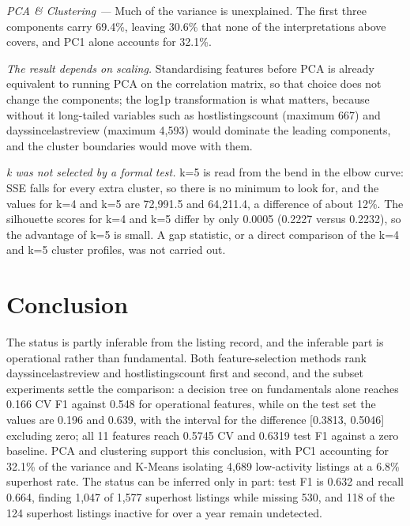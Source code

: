 \documentclass[final,1p,11pt]{elsarticle}
\renewcommand\_{\textunderscore\allowbreak}%
\begin{document}
\textit{PCA \& Clustering —} Much of the variance is unexplained. The first three components carry 69.4\%, leaving 30.6\% that none of the interpretations above covers, and PC1 alone accounts for 32.1\%.

\textit{The result depends on scaling.} Standardising features before PCA is already equivalent to running PCA on the correlation matrix, so that choice does not change the components; the log1p transformation is what matters, because without it long-tailed variables such as host\_listings\_count (maximum 667) and days\_since\_last\_review (maximum 4,593) would dominate the leading components, and the cluster boundaries would move with them.

\textit{k was not selected by a formal test.} k=5 is read from the bend in the elbow curve: SSE falls for every extra cluster, so there is no minimum to look for, and the values for k=4 and k=5 are 72,991.5 and 64,211.4, a difference of about 12\%. The silhouette scores for k=4 and k=5 differ by only 0.0005 (0.2227 versus 0.2232), so the advantage of k=5 is small. A gap statistic, or a direct comparison of the k=4 and k=5 cluster profiles, was not carried out.

\FloatBarrier

\section{Conclusion}

The status is partly inferable from the listing record, and the inferable part is operational rather than fundamental. Both feature-selection methods rank days\_since\_last\_review and host\_listings\_count first and second, and the subset experiments settle the comparison: a decision tree on fundamentals alone reaches 0.166 CV F1 against 0.548 for operational features, while on the test set the values are 0.196 and 0.639, with the interval for the difference [0.3813, 0.5046] excluding zero; all 11 features reach 0.5745 CV and 0.6319 test F1 against a zero baseline. PCA and clustering support this conclusion, with PC1 accounting for 32.1\% of the variance and K-Means isolating 4,689 low-activity listings at a 6.8\% superhost rate. The status can be inferred only in part: test F1 is 0.632 and recall 0.664, finding 1,047 of 1,577 superhost listings while missing 530, and 118 of the 124 superhost listings inactive for over a year remain undetected.

\end{document}
